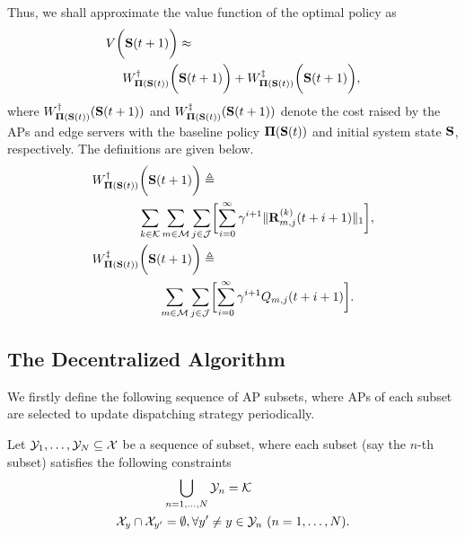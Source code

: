 Thus, we shall approximate the value function of the optimal policy as
\begin{align}
    &V\bigg(\mathbf{S}(t+1)\bigg) \approx
    \nonumber\\
    &~~~~W^{\dagger}_{\boldsymbol{\Pi}(\mathbf{S}(t))} \bigg(\mathbf{S}(t+1)\bigg)
    + W^{\ddagger}_{\boldsymbol{\Pi}(\mathbf{S}(t))}\bigg(\mathbf{S}(t+1)\bigg),
\end{align}
where $W^{\dagger}_{\boldsymbol{\Pi}(\mathbf{S}(t))}(\mathbf{S}(t+1))$ and $W^{\ddagger}_{\boldsymbol{\Pi}(\mathbf{S}(t))}(\mathbf{S}(t+1))$ denote the cost raised by the APs and edge servers with the baseline policy $\boldsymbol{\Pi}(\mathbf{S}(t))$ and initial system state $\mathbf{S}$, respectively.
The definitions are given below.
\begin{align}
    &W^{\dagger}_{\Baseline(\Stat(t))} \Paren{\Stat(t+1)} \define
    \nonumber\\
    &~~~~~~~~~~~\sum_{k\in\apSet}\sum_{m\in\esSet}\sum_{j\in\jSpace}\Bracket{
        \sum_{i=0}^{\infty} \gamma^{i+1} \Inorm{\vec{R}^{(k)}_{m,j}(t+i+1)}
    },
    \\    
    &W^{\ddagger}_{\Baseline(\Stat(t))}\Paren{\Stat(t+1)} \define
    \nonumber\\
    &~~~~~~~~~~~~~~~~\sum_{m\in\esSet}\sum_{j\in\jSpace}\Bracket{
        \sum_{i=0}^{\infty} \gamma^{i+1} Q_{m,j}(t+i+1)
    }.
\end{align}

\subsection{The Decentralized Algorithm}
\label{subsec:ap_alg}
We firstly define the following sequence of AP subsets, where APs of each subset are selected to update dispatching strategy periodically.
\begin{definition}
    Let $\mathcal{Y}_{1}, \dots, \mathcal{Y}_{N} \subseteq \mathcal{X}$ be a sequence of subset, where each subset (say the $n$-th subset) satisfies the following constraints
    \begin{align}
        &\bigcup_{n=1,\dots,N} \mathcal{Y}_{n} = \mathcal{K}
        \\
        \mathcal{X}_{y} \cap \mathcal{X}_{y'} &=\emptyset, \forall y' \neq y \in \mathcal{Y}_{n}~(n=1,\dots,N).
    \end{align}
\end{definition}

